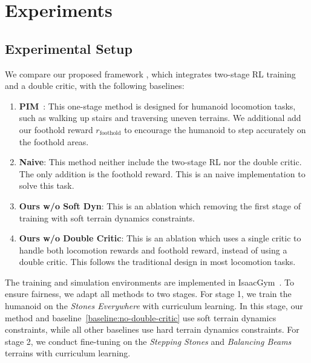 \section{Experiments}
\subsection{Experimental Setup}



We compare our proposed framework \beamdojo, which integrates two-stage RL training and a double critic, with the following baselines:

\begin{enumerate}
    \item \textbf{PIM}~\cite{long2024learninghumanoid}: This one-stage method is designed for humanoid locomotion tasks, such as walking up stairs and traversing uneven terrains. We additional add our foothold reward $r_\text{foothold}$ to encourage the humanoid to step accurately on the foothold areas.
    \label{baseline:pim}
    
    \item \textbf{Naive}: This method neither include the two-stage RL nor the double critic. The only addition is the foothold reward. This is an naive implementation to solve this task.
    \label{baseline:naive}
    
    \item \textbf{Ours w/o Soft Dyn}: This is an ablation which removing the first stage of training with soft terrain dynamics constraints.
    \label{baseline:no-stage-1}
    
    \item \textbf{Ours w/o Double Critic}: This is an ablation which uses a single critic to handle both locomotion rewards and foothold reward, instead of using a double critic. This follows the traditional design in most locomotion tasks.
    \label{baseline:no-double-critic}
\end{enumerate}

The training and simulation environments are implemented in IsaacGym~\cite{makoviychuk2021isaac}. To ensure fairness, we adapt all methods to two stages. For stage 1, we train the humanoid on the \textit{Stones Everywhere} with curriculum learning. In this stage, our method and baseline~\ref{baseline:no-double-critic} use soft terrain dynamics constraints, while all other baselines use hard terrain dynamics constraints. For stage 2, we conduct fine-tuning on the \textit{Stepping Stones} and \textit{Balancing Beams} terrains with curriculum learning.

